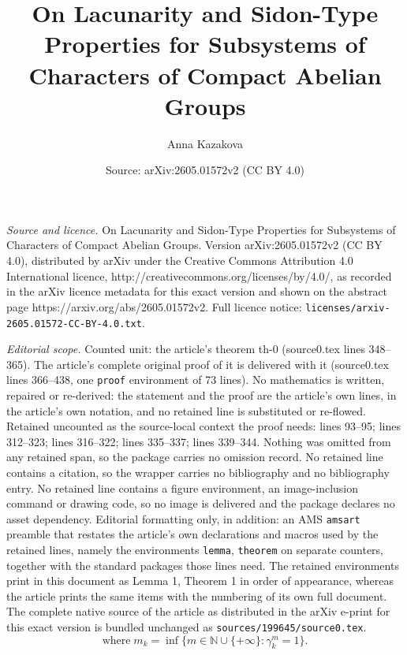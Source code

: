 \documentclass[10pt,a4paper]{amsart}
\title{On Lacunarity and Sidon-Type Properties for Subsystems of Characters of Compact Abelian Groups}
\author{Anna Kazakova}
\date{Source: arXiv:2605.01572v2 (CC BY 4.0)}
\begin{document}
\maketitle

\noindent\emph{Source and licence.} On Lacunarity and Sidon-Type Properties for Subsystems of Characters of Compact Abelian Groups. Version arXiv:2605.01572v2 (CC BY 4.0), distributed by arXiv under the Creative Commons Attribution 4.0 International licence, http://creativecommons.org/licenses/by/4.0/, as recorded in the arXiv licence metadata for this exact version and shown on the abstract page https://arxiv.org/abs/2605.01572v2. Full licence notice: \texttt{licenses/arxiv-2605.01572-CC-BY-4.0.txt}.\par\smallskip

\noindent\textit{Editorial scope.} Counted unit: the article's theorem th-0 (source0.tex lines 348--365). The article's complete original proof of it is delivered with it (source0.tex lines 366--438, one \texttt{proof} environment of 73 lines). No mathematics is written, repaired or re-derived: the statement and the proof are the article's own lines, in the article's own notation, and no retained line is substituted or re-flowed.  Retained uncounted as the source-local context the proof needs: lines 93--95; lines 312--323; lines 316--322; lines 335--337; lines 339--344.  Nothing was omitted from any retained span, so the package carries no omission record.  No retained line contains a citation, so the wrapper carries no bibliography and no bibliography entry.  No retained line contains a figure environment, an image-inclusion command or drawing code, so no image is delivered and the package declares no asset dependency.  Editorial formatting only, in addition: an AMS \texttt{amsart} preamble that restates the article's own declarations and macros used by the retained lines, namely the environments \texttt{lemma}, \texttt{theorem} on separate counters, together with the standard packages those lines need.  The retained environments print in this document as Lemma 1, Theorem 1 in order of appearance, whereas the article prints the same items with the numbering of its own full document.  The complete native source of the article as distributed in the arXiv e-print for this exact version is bundled unchanged as \texttt{sources/199645/source0.tex}.
	\begin{equation} \label{m_k}
		\text{where} \; m_k = \inf\{m\in \mathbb{N} \cup \{+\infty\} \colon \gamma_k^m =1\}.
	\end{equation}	
\end{document}
